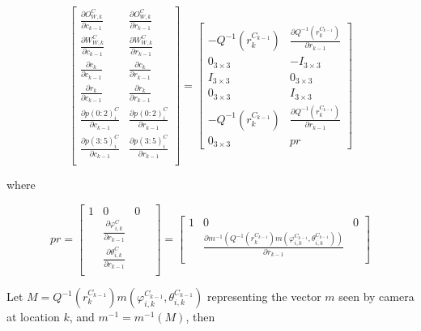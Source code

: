 \begin{equation}
\begin{bmatrix}
\frac{\partial O_{W,k}^{C}}{\partial c_{k-1}} & 
\frac{\partial O_{W,k}^{C}}{\partial r_{k-1}} \\
\frac{\partial W_{W,k}^{C}}{\partial c_{k-1}} &
\frac{\partial W_{W,k}^{C}}{\partial r_{k-1}} \\
\frac{\partial c_{k}}{\partial c_{k-1}} & 
\frac{\partial c_{k}}{\partial r_{k-1}} \\
\frac{\partial r_{k}}{\partial c_{k-1}} & 
\frac{\partial r_{k}}{\partial r_{k-1}} \\
\frac{\partial p(0:2)_{i}^{C}}{\partial c_{k-1}} & 
\frac{\partial p(0:2)_{i}^{C}}{\partial r_{k-1}} \\
\frac{\partial p(3:5)_{i}^{C}}{\partial c_{k-1}} & 
\frac{\partial p(3:5)_{i}^{C}}{\partial r_{k-1}} \\
\end{bmatrix}= \begin{bmatrix}
-Q^{-1}(r_{k}^{C_{k-1}}) & 
\frac{\partial Q^{-1}(r_{k}^{C_{k-1}})}{\partial r_{k-1}} \\
0_{3\times 3} & -I_{3\times 3} \\
I_{3\times 3} & 0_{3\times 3} \\
0_{3\times 3} & I_{3\times 3} \\
-Q^{-1}(r_{k}^{C_{k-1}}) & 
\frac{\partial Q^{-1}(r_{k}^{C_{k-1}})}{\partial r_{k-1}} \\
0_{3\times 3} & pr 
\end{bmatrix}
\end{equation}

\noindent where

\begin{equation}
pr=\begin{bmatrix}
1 & 0 & 0 & \\
&\frac{\partial \varphi _{i, k}^{C}}{\partial r_{k-1}} & \\
&\frac{\partial \theta _{i, k}^{C}}{\partial r_{k-1}} & \\
\end{bmatrix}= \begin{bmatrix}
1 & 0 & 0 \\
&\frac{\partial m^{-1}(Q^{-1}(r_{k}^{C_{k-1}})m(\varphi _{i, 
k}^{C_{k-1}}, \theta _{i, k}^{C_{k-1}}))}{\partial r_{k-1}} & \\
\end{bmatrix}
\end{equation}

Let $M=Q^{-1}(r_{k}^{C_{k-1}})m(\varphi_{i, k}^{C_{k-1}}, \theta _{i, 
k}^{C_{k-1}})$ representing the vector $m$ seen by camera at location
$k$, and $m^{-1}=m^{-1}(M)$, then


